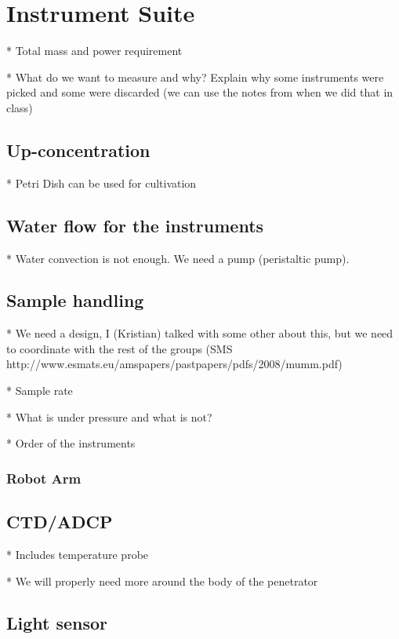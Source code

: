 \chapter{Instrument Suite}

* Total mass and power requirement

* What do we want to measure and why? Explain why some instruments were picked and some were discarded (we can use the notes from when we did that in class)

\section{Up-concentration}

* Petri Dish can be used for cultivation

\section{Water flow for the instruments} %

* Water convection is not enough. We need a pump (peristaltic pump).

\section{Sample handling}

* We need a design, I (Kristian) talked with some other about this, but we need to coordinate with the rest of the groups
   (SMS http://www.esmats.eu/amspapers/pastpapers/pdfs/2008/mumm.pdf)

* Sample rate

* What is under pressure and what is not?

* Order of the instruments

\subsection{Robot Arm} %


\section{CTD/ADCP}

* Includes temperature probe

    * We will properly need more around the body of the penetrator

\section{Light sensor}

